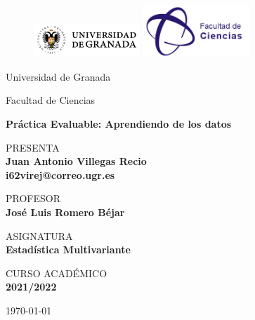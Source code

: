\documentclass[letterpaper,11pt]{article}
\begin{document}
\thispagestyle{empty}
	
	\begin{figure}[ht]
			\includegraphics[width=4cm]{./img/LogoUGRLargo.png}
	   \endminipage
			\includegraphics[width=4cm]{./img/LogoFacultadCiencias.jpeg}
		\endminipage
	\end{figure}
	
	\begin{center}
	\vspace{0.8cm}
	\LARGE
	Universidad de Granada
	
	\vspace{0.8cm}
	\LARGE
	Facultad de Ciencias
	
	\vspace{1.7cm}	
	\Large
	\textbf{Práctica Evaluable: Aprendiendo de los datos}

	\vspace{1.3cm}
	\normalsize	
	PRESENTA \\
	\vspace{.3cm}
	\large
	\textbf{Juan Antonio Villegas Recio \\ i62virej@correo.ugr.es}
	
	\vspace{1.3cm}
	\normalsize	
	PROFESOR \\
	\vspace{.3cm}
	\large
	\textbf{José Luis Romero Béjar}
	
	\vspace{1.3cm}
	\normalsize	
	ASIGNATURA \\
	\vspace{.3cm}
	\large
	\textbf{Estadística Multivariante}
	
	\vspace{1.3cm}
	\normalsize	
	CURSO ACADÉMICO \\
	\vspace{.3cm}
	\large
	\textbf{2021/2022}
	
	\vspace{1.3cm}
	\today
	\end{center}
	
\end{document}
